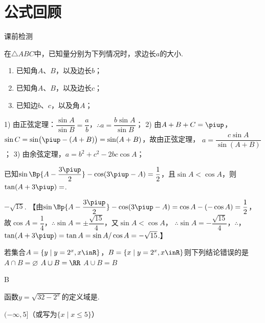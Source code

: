 \section{公式回顾}
  \begin{exercise}{\heiti 课前检测}\\
    \item %
      在$\triangle{ABC}$中，已知量分别为下列情况时，求边长$a$的大小.
      \begin{enumerate}[label=\arabic*)]
        \item 已知角$A$、$B$，以及边长$b$；
        \item 已知角$A$、$B$，以及边长$c$；
        \item 已知边$b$、$c$，以及角$A$；
      \end{enumerate}
      \begin{answer}
          1) 由正弦定理：$\dfrac{\sin A}{\sin B}=\dfrac{a}b$，$\therefore a=\dfrac{b\sin A}{\sin B}$；
          2) 由$A+B+C=\piup$，$\sin C=\sin\bigl(\piup-(A+B)\bigr)=\sin(A+B)$，故由正弦定理，
             $a=\dfrac{c\sin A}{\sin (A+B)}$；
          3) 由余弦定理，$a=b^2+c^2-2bc\cos A$；
      \end{answer}
    \vspace{4em}
    \item %
      已知$\sin\Bp{A-\dfrac{3\piup}2}-\cos(3\piup-A)=\dfrac1{2}$，且$\sin{A}<\cos{A}$，则$\tan(A+3\piup)=$\tk.
      \begin{answer}
        $-\sqrt{15}$.
        【由$\sin\Bp{A-\dfrac{3\piup}2}-\cos(3\piup-A)=\cos A-(-\cos A)=\dfrac1{2}$，
        故$\cos{A}=\dfrac1{4}$，$\therefore \sin{A}=\pm\dfrac{\sqrt{15}}4$，又$\sin{A}<\cos{A}$，
        $\therefore \sin{A}=-\dfrac{\sqrt{15}}4$，$\therefore $，$\tan(A+3\piup)=\tan{A}=\sin{A}/\cos{A}=-\sqrt{15}$.】
      \end{answer}
    \item %
      若集合$A=\{y\mid y=2^x,x\inR\}$，$B=\{x\mid y=2^x,x\inR\}$则下列结论错误的是\xz
       {$A\cap B=\varnothing$}
       {$A\cup B=\RR$}
       {$A\cup B=B$}
       \begin{answer}
         B
       \end{answer}
      \item 函数$y=\sqrt{32-2^x}$的定义域是\tk.
      \begin{answer}
        $(-\infty,5]$（或写为$\{x\mid x\leqslant5\}$）
      \end{answer}
  \end{exercise}
